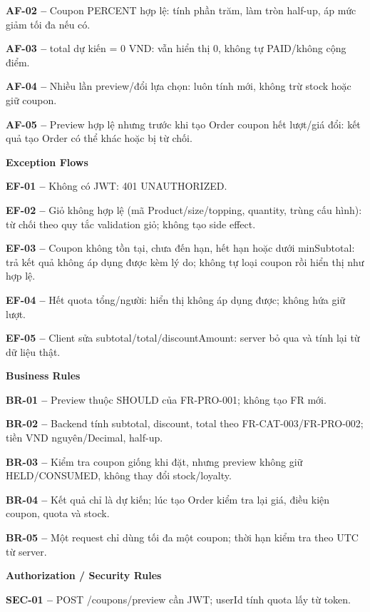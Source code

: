 \documentclass[11pt,a4paper,oneside]{report}
\begin{document}
\textbf{AF-02 --} Coupon PERCENT hợp lệ: tính phần trăm, làm tròn half-up, áp mức giảm tối đa nếu có.

\textbf{AF-03 --} total dự kiến = 0 VND: vẫn hiển thị 0, không tự PAID/không cộng điểm.

\textbf{AF-04 --} Nhiều lần preview/đổi lựa chọn: luôn tính mới, không trừ stock hoặc giữ coupon.

\textbf{AF-05 --} Preview hợp lệ nhưng trước khi tạo Order coupon hết lượt/giá đổi: kết quả tạo Order có thể khác hoặc bị từ chối.
\par

\par\smallskip\noindent\textcolor{sgublue}{\textbf{Exception Flows}}\par\nobreak
\textbf{EF-01 --} Không có JWT: 401 UNAUTHORIZED.

\textbf{EF-02 --} Giỏ không hợp lệ (mã Product/size/topping, quantity, trùng cấu hình): từ chối theo quy tắc validation giỏ; không tạo side effect.

\textbf{EF-03 --} Coupon không tồn tại, chưa đến hạn, hết hạn hoặc dưới minSubtotal: trả kết quả không áp dụng được kèm lý do; không tự loại coupon rồi hiển thị như hợp lệ.

\textbf{EF-04 --} Hết quota tổng/người: hiển thị không áp dụng được; không hứa giữ lượt.

\textbf{EF-05 --} Client sửa subtotal/total/discountAmount: server bỏ qua và tính lại từ dữ liệu thật.
\par

\par\smallskip\noindent\textcolor{sgublue}{\textbf{Business Rules}}\par\nobreak
\textbf{BR-01 --} Preview thuộc SHOULD của FR-PRO-001; không tạo FR mới.

\textbf{BR-02 --} Backend tính subtotal, discount, total theo FR-CAT-003/FR-PRO-002; tiền VND nguyên/Decimal, half-up.

\textbf{BR-03 --} Kiểm tra coupon giống khi đặt, nhưng preview không giữ HELD/CONSUMED, không thay đổi stock/loyalty.

\textbf{BR-04 --} Kết quả chỉ là dự kiến; lúc tạo Order kiểm tra lại giá, điều kiện coupon, quota và stock.

\textbf{BR-05 --} Một request chỉ dùng tối đa một coupon; thời hạn kiểm tra theo UTC từ server.
\par

\par\smallskip\noindent\textcolor{sgublue}{\textbf{Authorization / Security Rules}}\par\nobreak
\textbf{SEC-01 --} POST /coupons/preview cần JWT; userId tính quota lấy từ token.
\end{document}
